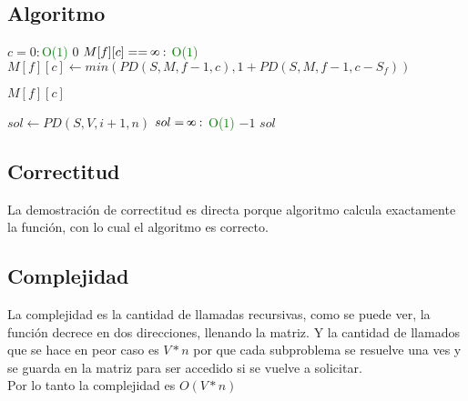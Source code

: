 \subsection{Algoritmo}
\begin{codebox}
    \li \If $c = 0:$\quad\quad\textcolor{green}{O($1$)}
        \Then
    \li     \Return $0$
        \End
    \li        \If $M[f][c] == \infinity:$ \quad\quad\textcolor{green}{O($1$)}
                \Then
                \li $M[f][c] \leftarrow min(PD(S,M,f-1,c),1+PD(S,M,f-1,c-S_{f}))$
                \End

    \li \Return $M[f][c]$
    \end{codebox}
    \begin{codebox}
    \li $sol \leftarrow PD(S,V,i+1,n)$
    \li \If $sol = \infinity:$ \quad\quad\textcolor{green}{O($1$)}
        \Then
    \li   
            \Return $-1$
        \End
    \li     \Return $sol$

    \end{codebox}    
\subsection{Correctitud}
La demostraci\'on de correctitud es directa porque algoritmo calcula exactamente la función, con lo cual el algoritmo es correcto.\\
\subsection{Complejidad}
La complejidad es la cantidad de llamadas recursivas, como se puede ver, la función decrece en dos direcciones, llenando la matriz. Y la cantidad de llamados que se hace en peor caso es $V*n$ por que cada subproblema se resuelve una ves y se guarda en la matriz para ser accedido si se vuelve a solicitar.\\
Por lo tanto la complejidad es $O(V*n)$